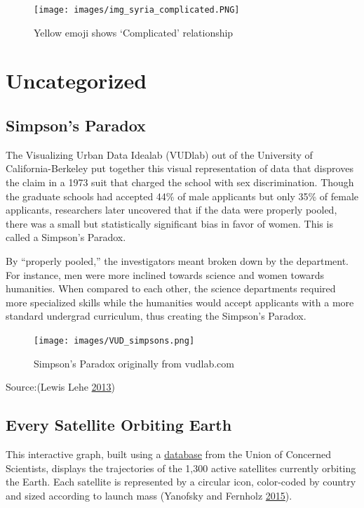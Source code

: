 \documentclass[]{book}
\begin{document}
\begin{figure}
\centering
\texttt{[image: images/img\_syria\_complicated.PNG]}
\caption{Yellow emoji shows `Complicated' relationship}
\end{figure}

\hypertarget{uncategorized}{%
\section{Uncategorized}\label{uncategorized}}

\hypertarget{simpsons-paradox}{%
\subsection{Simpson's Paradox}\label{simpsons-paradox}}

The Visualizing Urban Data Idealab (VUDlab) out of the University of California-Berkeley put together this visual representation of data that disproves the claim in a 1973 suit that charged the school with sex discrimination. Though the graduate schools had accepted 44\% of male applicants but only 35\% of female applicants, researchers later uncovered that if the data were properly pooled, there was a small but statistically significant bias in favor of women. This is called a Simpson's Paradox.

By ``properly pooled,'' the investigators meant broken down by the department. For instance, men were more inclined towards science and women towards humanities. When compared to each other, the science departments required more specialized skills while the humanities would accept applicants with a more standard undergrad curriculum, thus creating the Simpson's Paradox.

\begin{figure}
\centering
\texttt{[image: images/VUD\_simpsons.png]}
\caption{Simpson's Paradox originally from vudlab.com}
\end{figure}

Source:(Lewis Lehe \protect\hyperlink{ref-simpson_paradox}{2013})

\hypertarget{every-satellite-orbiting-earth}{%
\subsection{Every Satellite Orbiting Earth}\label{every-satellite-orbiting-earth}}

This interactive graph, built using a \href{https://www.ucsusa.org/nuclear-weapons/space-weapons/satellite-database\#.WxbaMVMvzq1}{database} from the Union of Concerned Scientists, displays the trajectories of the 1,300 active satellites currently orbiting the Earth. Each satellite is represented by a circular icon, color-coded by country and sized according to launch mass (Yanofsky and Fernholz \protect\hyperlink{ref-Satellite}{2015}).
\end{document}
